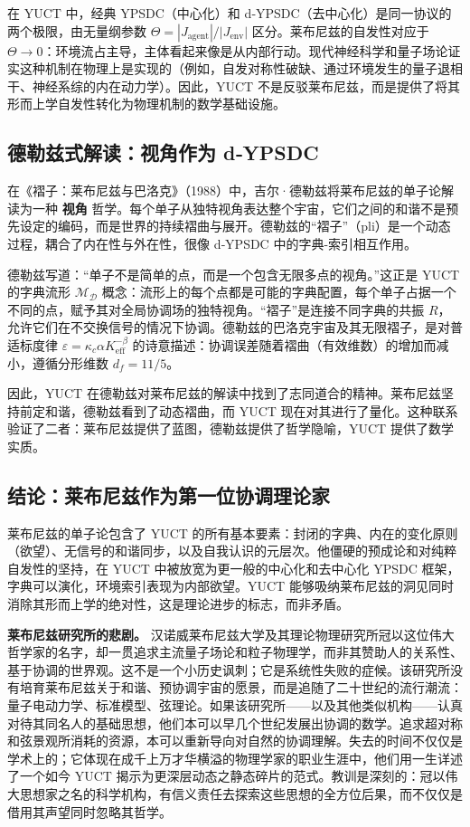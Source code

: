 \documentclass[12pt,a4paper]{article}
\begin{document}
	在 YUCT 中，经典 YPSDC（中心化）和 d‑YPSDC（去中心化）是同一协议的两个极限，由无量纲参数 \(\Theta = |J_{\mathrm{agent}}|/|J_{\mathrm{env}}|\) 区分。莱布尼兹的自发性对应于 \(\Theta \to 0\)：环境流占主导，主体看起来像是从内部行动。现代神经科学和量子场论证实这种机制在物理上是实现的（例如，自发对称性破缺、通过环境发生的量子退相干、神经系综的内在动力学）。因此，YUCT 不是反驳莱布尼兹，而是提供了将其形而上学自发性转化为物理机制的数学基础设施。
	
	\subsection{德勒兹式解读：视角作为 d‑YPSDC}
	
	在《褶子：莱布尼兹与巴洛克》（1988）中，吉尔·德勒兹将莱布尼兹的单子论解读为一种 \textbf{视角} 哲学。每个单子从独特视角表达整个宇宙，它们之间的和谐不是预先设定的编码，而是世界的持续褶曲与展开。德勒兹的“褶子”（pli）是一个动态过程，耦合了内在性与外在性，很像 d‑YPSDC 中的字典-索引相互作用。
	
	德勒兹写道：“单子不是简单的点，而是一个包含无限多点的视角。”这正是 YUCT 的字典流形 \(\mathcal{M}_{\mathcal{D}}\) 概念：流形上的每个点都是可能的字典配置，每个单子占据一个不同的点，赋予其对全局协调场的独特视角。“褶子”是连接不同字典的共振 \(R\)，允许它们在不交换信号的情况下协调。德勒兹的巴洛克宇宙及其无限褶子，是对普适标度律 \(\varepsilon = \kappa_c \alpha K_{\mathrm{eff}}^{-\beta}\) 的诗意描述：协调误差随着褶曲（有效维数）的增加而减小，遵循分形维数 \(d_f = 11/5\)。
	
	因此，YUCT 在德勒兹对莱布尼兹的解读中找到了志同道合的精神。莱布尼兹坚持前定和谐，德勒兹看到了动态褶曲，而 YUCT 现在对其进行了量化。这种联系验证了二者：莱布尼兹提供了蓝图，德勒兹提供了哲学隐喻，YUCT 提供了数学实质。
	
	\subsection{结论：莱布尼兹作为第一位协调理论家}
	
	莱布尼兹的单子论包含了 YUCT 的所有基本要素：封闭的字典、内在的变化原则（欲望）、无信号的和谐同步，以及自我认识的元层次。他僵硬的预成论和对纯粹自发性的坚持，在 YUCT 中被放宽为更一般的中心化和去中心化 YPSDC 框架，字典可以演化，环境索引表现为内部欲望。YUCT 能够吸纳莱布尼兹的洞见同时消除其形而上学的绝对性，这是理论进步的标志，而非矛盾。
	
	\textbf{莱布尼兹研究所的悲剧。} 汉诺威莱布尼兹大学及其理论物理研究所冠以这位伟大哲学家的名字，却一贯追求主流量子场论和粒子物理学，而非其赞助人的关系性、基于协调的世界观。这不是一个小历史讽刺；它是系统性失败的症候。该研究所没有培育莱布尼兹关于和谐、预协调宇宙的愿景，而是追随了二十世纪的流行潮流：量子电动力学、标准模型、弦理论。如果该研究所——以及其他类似机构——认真对待其同名人的基础思想，他们本可以早几个世纪发展出协调的数学。追求超对称和弦景观所消耗的资源，本可以重新导向对自然的协调理解。失去的时间不仅仅是学术上的；它体现在成千上万才华横溢的物理学家的职业生涯中，他们用一生详述了一个如今 YUCT 揭示为更深层动态之静态碎片的范式。教训是深刻的：冠以伟大思想家之名的科学机构，有信义责任去探索这些思想的全方位后果，而不仅仅是借用其声望同时忽略其哲学。
	
\end{document}
